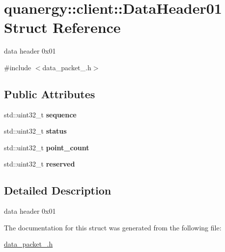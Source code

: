 \hypertarget{structquanergy_1_1client_1_1DataHeader01}{\section{quanergy\-:\-:client\-:\-:Data\-Header01 Struct Reference}
\label{structquanergy_1_1client_1_1DataHeader01}
}


data header 0x01  




{\ttfamily \#include $<$data\-\_\-packet\-\_.\-h$>$}

\subsection*{Public Attributes}
\begin{DoxyCompactItemize}
\item 
\hypertarget{structquanergy_1_1client_1_1DataHeader01_a56bafe8f3ff1c345d53595a0f47c43e1}{std\-::uint32\-\_\-t {\bfseries sequence}}\label{structquanergy_1_1client_1_1DataHeader01_a56bafe8f3ff1c345d53595a0f47c43e1}

\item 
\hypertarget{structquanergy_1_1client_1_1DataHeader01_a864b824ae8fd3ef0b1009e10a6dac4ff}{std\-::uint32\-\_\-t {\bfseries status}}\label{structquanergy_1_1client_1_1DataHeader01_a864b824ae8fd3ef0b1009e10a6dac4ff}

\item 
\hypertarget{structquanergy_1_1client_1_1DataHeader01_acf4fddc627617c3128214dd2c7c6094e}{std\-::uint32\-\_\-t {\bfseries point\-\_\-count}}\label{structquanergy_1_1client_1_1DataHeader01_acf4fddc627617c3128214dd2c7c6094e}

\item 
\hypertarget{structquanergy_1_1client_1_1DataHeader01_a1e62b8d487dae3d579b5f74d9d5dde60}{std\-::uint32\-\_\-t {\bfseries reserved}}\label{structquanergy_1_1client_1_1DataHeader01_a1e62b8d487dae3d579b5f74d9d5dde60}

\end{DoxyCompactItemize}


\subsection{Detailed Description}
data header 0x01 

The documentation for this struct was generated from the following file\-:\begin{DoxyCompactItemize}
\item 
\hyperlink{data__packet__01_8h}{data\-\_\-packet\-\_.\-h}\end{DoxyCompactItemize}
